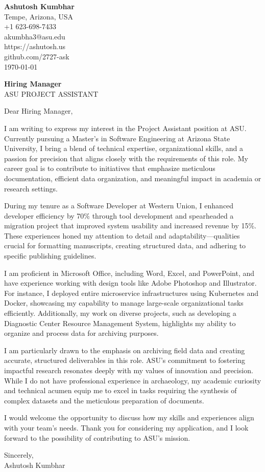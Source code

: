 \documentclass[11pt]{article}
\begin{document}
\begin{flushleft}
\textbf{Ashutosh Kumbhar} \\
Tempe, Arizona, USA \\
+1 623-698-7433 \\
akumbha3@asu.edu \\
https://ashutosh.us \\
github.com/2727-ask \\
\today
\end{flushleft}

\vspace{0.5em}

\textbf{Hiring Manager} \\
ASU PROJECT ASSISTANT \\

\vspace{1em}

Dear Hiring Manager,

I am writing to express my interest in the Project Assistant position at ASU. Currently pursuing a Master's in Software Engineering at Arizona State University, I bring a blend of technical expertise, organizational skills, and a passion for precision that aligns closely with the requirements of this role. My career goal is to contribute to initiatives that emphasize meticulous documentation, efficient data organization, and meaningful impact in academia or research settings.

During my tenure as a Software Developer at Western Union, I enhanced developer efficiency by 70\% through tool development and spearheaded a migration project that improved system usability and increased revenue by 15\%. These experiences honed my attention to detail and adaptability—qualities crucial for formatting manuscripts, creating structured data, and adhering to specific publishing guidelines.

I am proficient in Microsoft Office, including Word, Excel, and PowerPoint, and have experience working with design tools like Adobe Photoshop and Illustrator. For instance, I deployed entire microservice infrastructures using Kubernetes and Docker, showcasing my capability to manage large-scale organizational tasks efficiently. Additionally, my work on diverse projects, such as developing a Diagnostic Center Resource Management System, highlights my ability to organize and process data for archiving purposes.

I am particularly drawn to the emphasis on archiving field data and creating accurate, structured deliverables in this role. ASU’s commitment to fostering impactful research resonates deeply with my values of innovation and precision. While I do not have professional experience in archaeology, my academic curiosity and technical acumen equip me to excel in tasks requiring the synthesis of complex datasets and the meticulous preparation of documents.

I would welcome the opportunity to discuss how my skills and experiences align with your team's needs. Thank you for considering my application, and I look forward to the possibility of contributing to ASU's mission.

Sincerely, \\
Ashutosh Kumbhar
\end{document}
